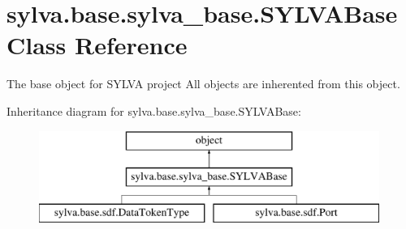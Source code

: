 \hypertarget{classsylva_1_1base_1_1sylva__base_1_1_s_y_l_v_a_base}{}\section{sylva.\+base.\+sylva\+\_\+base.\+S\+Y\+L\+V\+A\+Base Class Reference}
\label{classsylva_1_1base_1_1sylva__base_1_1_s_y_l_v_a_base}


The base object for S\+Y\+L\+VA project All objects are inherented from this object.  


Inheritance diagram for sylva.\+base.\+sylva\+\_\+base.\+S\+Y\+L\+V\+A\+Base\+:\begin{figure}[H]
\begin{center}
\leavevmode
\includegraphics[height=3.000000cm]{classsylva_1_1base_1_1sylva__base_1_1_s_y_l_v_a_base}
\end{center}
\end{figure}
